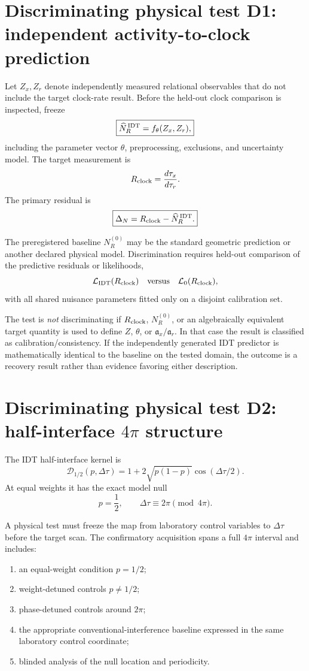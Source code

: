 \documentclass[11pt]{book}
\begin{document}
\section{Discriminating physical test D1: independent activity-to-clock prediction}

Let \(Z_x,Z_r\) denote independently measured relational observables that do not include the target clock-rate result. Before the held-out clock comparison is inspected, freeze
\[
\boxed{
\widehat N_R^{\,\rm IDT}
=
f_{\theta}(Z_x,Z_r),
}
\]
including the parameter vector \(\theta\), preprocessing, exclusions, and uncertainty model. The target measurement is
\[
R_{\rm clock}
=
\frac{d\tau_x}{d\tau_r}.
\]
The primary residual is
\[
\boxed{
\Delta_N
=
R_{\rm clock}
-
\widehat N_R^{\,\rm IDT}.
}
\]

The preregistered baseline \(N_R^{(0)}\) may be the standard geometric prediction or another declared physical model. Discrimination requires held-out comparison of the predictive residuals or likelihoods,
\[
\mathcal L_{\rm IDT}(R_{\rm clock})
\quad\text{versus}\quad
\mathcal L_{0}(R_{\rm clock}),
\]
with all shared nuisance parameters fitted only on a disjoint calibration set.

The test is \emph{not} discriminating if \(R_{\rm clock}\), \(N_R^{(0)}\), or an algebraically equivalent target quantity is used to define \(Z\), \(\theta\), or \(\mathfrak a_x/\mathfrak a_r\). In that case the result is classified as calibration/consistency. If the independently generated IDT predictor is mathematically identical to the baseline on the tested domain, the outcome is a recovery result rather than evidence favoring either description.

\section{Discriminating physical test D2: half-interface \(4\pi\) structure}

The IDT half-interface kernel is
\[
\boxed{
\mathcal D_{1/2}(p,\Delta\tau)
=
1+2\sqrt{p(1-p)}\cos(\Delta\tau/2).
}
\]
At equal weights it has the exact model null
\[
p=\frac12,
\qquad
\Delta\tau\equiv2\pi\pmod{4\pi}.
\]

A physical test must freeze the map from laboratory control variables to \(\Delta\tau\) before the target scan. The confirmatory acquisition spans a full \(4\pi\) interval and includes:
\begin{enumerate}
\item an equal-weight condition \(p=1/2\);
\item weight-detuned controls \(p\neq1/2\);
\item phase-detuned controls around \(2\pi\);
\item the appropriate conventional-interference baseline expressed in the same laboratory control coordinate;
\item blinded analysis of the null location and periodicity.
\end{enumerate}
\end{document}

